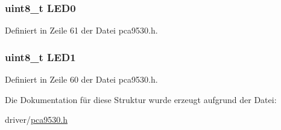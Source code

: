 \subsubsection[{L\+E\+D0}]{\setlength{\rightskip}{0pt plus 5cm}uint8\+\_\+t L\+E\+D0}\label{structpca9530__sel_a698763138aab81826861fd602c87872b}


Definiert in Zeile 61 der Datei pca9530.\+h.

\hypertarget{structpca9530__sel_a40e423e01a324e06ebc015b85a9d6b8e}{}
\subsubsection[{L\+E\+D1}]{\setlength{\rightskip}{0pt plus 5cm}uint8\+\_\+t L\+E\+D1}\label{structpca9530__sel_a40e423e01a324e06ebc015b85a9d6b8e}


Definiert in Zeile 60 der Datei pca9530.\+h.



Die Dokumentation für diese Struktur wurde erzeugt aufgrund der Datei\+:\begin{DoxyCompactItemize}
\item 
driver/\hyperlink{pca9530_8h}{pca9530.\+h}\end{DoxyCompactItemize}
